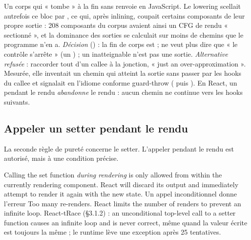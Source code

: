 \begin{decision}
Un corps qui « tombe » à la fin sans  renvoie  en
JavaScript. Le lowering scellait autrefois ce bloc par , ce
qui, après inlining, coupait certains composants de leur propre sortie : 208
composants du corpus avaient ainsi un CFG de rendu « sectionné », et la
dominance des sorties se calculait sur moins de chemins que le programme n'en a.
\emph{Décision} () : la fin de corps est  ;
 ne veut plus dire que « le contrôle s'arrête » (un
) ; un  inatteignable n'est pas une sortie.
\emph{Alternative refusée} : raccorder tout  d'un callee à la
jonction, « just an over-approximation ». Mesurée, elle inventait un chemin
qui atteint la sortie sans passer par les hooks du callee et signalait en
\Error{} l'idiome conforme \og guard-throw\fg{}
( puis ). En React, un
 pendant le rendu \emph{abandonne} le rendu : aucun chemin ne
continue vers les hooks suivants.
\end{decision}

\subsection{Appeler un setter pendant le rendu}

La seconde règle de pureté concerne le setter. L'appeler pendant le rendu est
autorisé, mais à une condition précise.

\begin{react}
\og Calling the set function \emph{during rendering} is only allowed from within
the currently rendering component. React will discard its output and
immediately attempt to render it again with the new state.\fg{} Un appel
inconditionnel donne l'erreur \og Too many re-renders. React limits the number
of renders to prevent an infinite loop.\fg{} \cite{ReactDocs} React-tRace
(§3.1.2) : \og an unconditional top-level call to a setter function causes an
infinite loop and is never correct\fg{}, même quand la valeur écrite est
toujours la même ; le runtime lève une exception après 25 tentatives.
\end{react}


